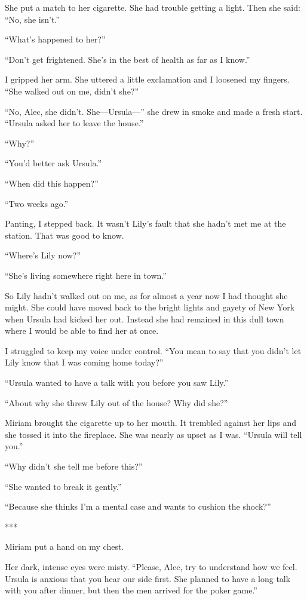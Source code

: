 \documentclass{novel}
\begin{document}
She put a match to her cigarette. She had trouble getting a light. Then she said: “No, she isn’t.”

“What’s happened to her?”

“Don’t get frightened. She’s in the best of health as far as I know.”

I gripped her arm. She uttered a little exclamation and I loosened my fingers. “She walked out on me, didn’t she?”

“No, Alec, she didn’t. She—Ursula—” she drew in smoke and made a fresh start. “Ursula asked her to leave the house.”

“Why?”

“You’d better ask Ursula.”

“When did this happen?”

“Two weeks ago.”

Panting, I stepped back. It wasn’t Lily’s fault that she hadn’t met me at the station. That was good to know.

“Where’s Lily now?”

“She’s living somewhere right here in town.”

So Lily hadn’t walked out on me, as for almost a year now I had thought she might. She could have moved back to the bright lights and gayety of New York when Ursula had kicked her out. Instead she had remained in this dull town where I would be able to find her at once.

I struggled to keep my voice under control. “You mean to say that you didn’t let Lily know that I was coming home today?”

“Ursula wanted to have a talk with you before you saw Lily.”

“About why she threw Lily out of the house? Why did she?”

Miriam brought the cigarette up to her mouth. It trembled against her lips and she tossed it into the fireplace. She was nearly as upset as I was. “Ursula will tell you.”

“Why didn’t she tell me before this?”

“She wanted to break it gently.”

“Because she thinks I’m a mental case and wants to cushion the shock?”

***

Miriam put a hand on my chest.

Her dark, intense eyes were misty. “Please, Alec, try to understand how we feel. Ursula is anxious that you hear our side first. She planned to have a long talk with you after dinner, but then the men arrived for the poker game.”
\end{document}
